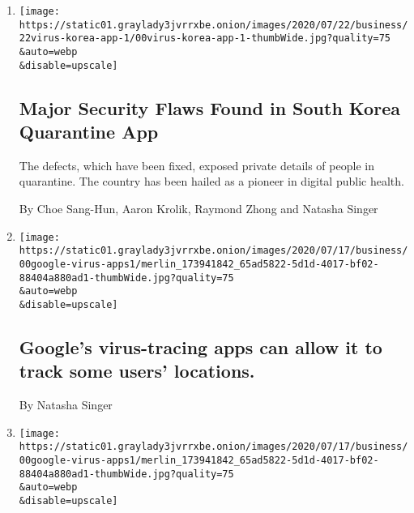 \begin{enumerate}
\def\labelenumi{\arabic{enumi}.}
\item
  \href{/2020/07/21/technology/korea-coronavirus-app-security.html}{}

  \texttt{[image: https://static01.graylady3jvrrxbe.onion/images/2020/07/22/business/22virus-korea-app-1/00virus-korea-app-1-thumbWide.jpg?quality=75\\\&auto=webp\\\&disable=upscale]}

  \hypertarget{major-security-flaws-found-in-south-korea-quarantine-app}{%
  \subsection{Major Security Flaws Found in South Korea Quarantine
  App}\label{major-security-flaws-found-in-south-korea-quarantine-app}}

  The defects, which have been fixed, exposed private details of people
  in quarantine. The country has been hailed as a pioneer in digital
  public health.

  By Choe Sang-Hun, Aaron Krolik, Raymond Zhong and Natasha Singer
\item
  \href{/2020/07/21/business/googles-virus-tracing-apps-can-allow-it-to-track-some-users-locations.html}{}

  \texttt{[image: https://static01.graylady3jvrrxbe.onion/images/2020/07/17/business/00google-virus-apps1/merlin\_173941842\_65ad5822-5d1d-4017-bf02-88404a880ad1-thumbWide.jpg?quality=75\\\&auto=webp\\\&disable=upscale]}

  \hypertarget{googles-virus-tracing-apps-can-allow-it-to-track-some-users-locations}{%
  \subsection{Google's virus-tracing apps can allow it to track some
  users'
  locations.}\label{googles-virus-tracing-apps-can-allow-it-to-track-some-users-locations}}

  By Natasha Singer
\item
  \href{/live/2020/07/20/business/stock-market-today-coronavirus/googles-virus-tracing-apps-can-allow-it-to-track-some-users-locations}{}

  \texttt{[image: https://static01.graylady3jvrrxbe.onion/images/2020/07/17/business/00google-virus-apps1/merlin\_173941842\_65ad5822-5d1d-4017-bf02-88404a880ad1-thumbWide.jpg?quality=75\\\&auto=webp\\\&disable=upscale]}

  \hypertarget{googles-virus-tracing-apps-can-allow-it-to-track-some-users-locations-1}{%
}
\end{enumerate}
